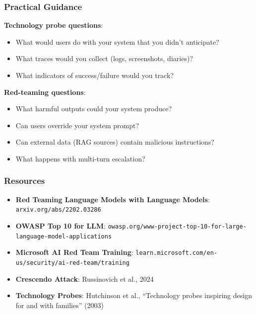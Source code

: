 \subsubsection*{Practical Guidance}

\begin{tipbox}
\textbf{Technology probe questions}:
\begin{itemize}
  \item What would users do with your system that you didn't anticipate?
  \item What traces would you collect (logs, screenshots, diaries)?
  \item What indicators of success/failure would you track?
\end{itemize}

\textbf{Red-teaming questions}:
\begin{itemize}
  \item What harmful outputs could your system produce?
  \item Can users override your system prompt?
  \item Can external data (RAG sources) contain malicious instructions?
  \item What happens with multi-turn escalation?
\end{itemize}
\end{tipbox}

\subsubsection*{Resources}
\begin{itemize}
  \item \textbf{Red Teaming Language Models with Language Models}: \texttt{arxiv.org/abs/2202.03286}
  \item \textbf{OWASP Top 10 for LLM}: \texttt{owasp.org/www-project-top-10-for-large-language-model-applications}
  \item \textbf{Microsoft AI Red Team Training}: \texttt{learn.microsoft.com/en-us/security/ai-red-team/training}
  \item \textbf{Crescendo Attack}: Russinovich et al., 2024
  \item \textbf{Technology Probes}: Hutchinson et al., ``Technology probes inspiring design for and with families'' (2003)
\end{itemize}


